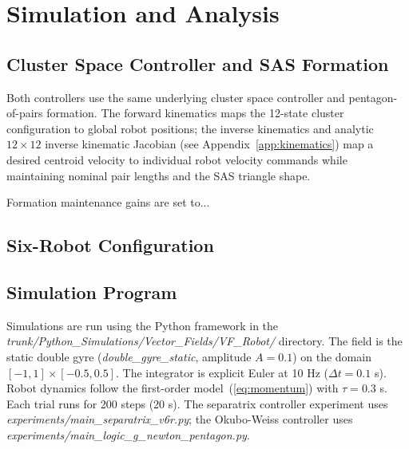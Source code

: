 \documentclass[lettersize,journal]{IEEEtran}
\begin{document}
\section{Simulation and Analysis}
\label{sec:methods}

\subsection{Cluster Space Controller and SAS Formation}

Both controllers use the same underlying cluster space controller and
pentagon-of-pairs formation. The forward kinematics maps the 12-state
cluster configuration to global robot positions; the inverse kinematics
and analytic $12 \times 12$ inverse kinematic Jacobian (see
Appendix~\ref{app:kinematics}) map a desired centroid velocity to
individual robot velocity commands while maintaining nominal pair lengths
and the SAS triangle shape.

Formation maintenance gains are set to...

\subsection{Six-Robot Configuration}


\subsection{Simulation Program}

Simulations are run using the Python framework in the
\textit{trunk/Python\_Simulations/Vector\_Fields/VF\_Robot/} directory.
The field is the static double gyre (\textit{double\_gyre\_static},
amplitude $A = 0.1$) on the domain $[-1, 1] \times [-0.5, 0.5]$. The
integrator is explicit Euler at 10 Hz ($\Delta t = 0.1$ s). Robot dynamics
follow the first-order model~(\ref{eq:momentum}) with $\tau = 0.3$ s. Each
trial runs for 200 steps (20 s). The separatrix controller experiment uses
\textit{experiments/main\_separatrix\_v6r.py}; the Okubo-Weiss controller
uses \textit{experiments/main\_logic\_g\_newton\_pentagon.py}.
\end{document}
